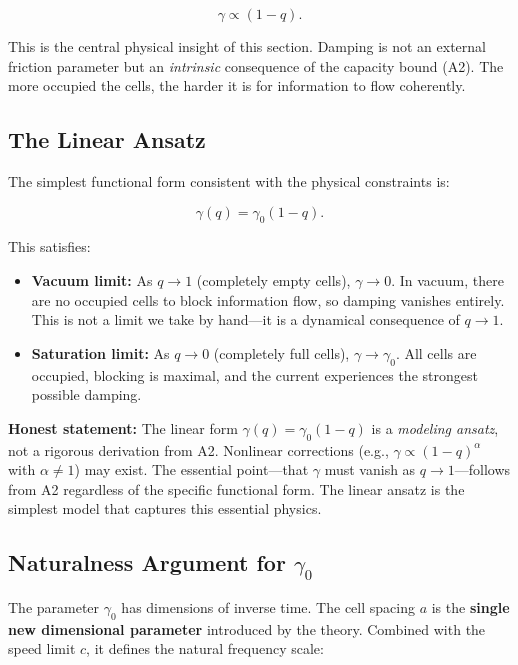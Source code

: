 \documentclass[aps,prd,twocolumn,showpacs,superscriptaddress,preprintnumbers]{revtex4-2}
\begin{document}
\begin{equation}
\gamma \propto (1-q).
\label{eq:gamma_scaling}
\end{equation}

This is the central physical insight of this section.
Damping is not an external friction parameter but an \emph{intrinsic} consequence of the capacity bound (A2).
The more occupied the cells, the harder it is for information to flow coherently.

\subsection{The Linear Ansatz}

The simplest functional form consistent with the physical constraints is:

\begin{equation}
\boxed{\gamma(q) = \gamma_0 (1-q)}.
\label{eq:gamma_linear}
\end{equation}

This satisfies:

\begin{itemize}
    \item \textbf{Vacuum limit:} As $q\to 1$ (completely empty cells), $\gamma\to 0$. In vacuum, there are no occupied cells to block information flow, so damping vanishes entirely. This is not a limit we take by hand---it is a dynamical consequence of $q\to 1$.
    \item \textbf{Saturation limit:} As $q\to 0$ (completely full cells), $\gamma\to\gamma_0$. All cells are occupied, blocking is maximal, and the current experiences the strongest possible damping.
\end{itemize}

\textbf{Honest statement:} The linear form $\gamma(q)=\gamma_0(1-q)$ is a \emph{modeling ansatz}, not a rigorous derivation from A2.
Nonlinear corrections (e.g., $\gamma\propto(1-q)^\alpha$ with $\alpha\neq 1$) may exist.
The essential point---that $\gamma$ must vanish as $q\to 1$---follows from A2 regardless of the specific functional form.
The linear ansatz is the simplest model that captures this essential physics.

\subsection{Naturalness Argument for $\gamma_0$}
\label{sec:naturalness}

The parameter $\gamma_0$ has dimensions of inverse time.
The cell spacing $a$ is the \textbf{single new dimensional parameter} introduced by the theory.
Combined with the speed limit $c$, it defines the natural frequency scale:
\end{document}

